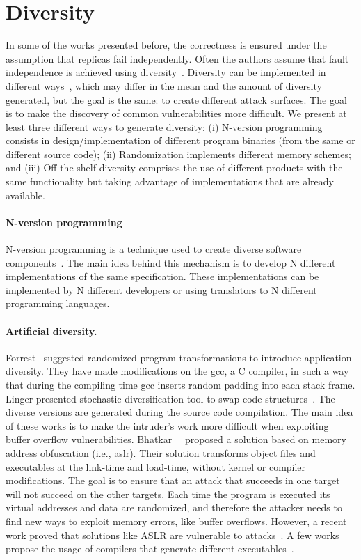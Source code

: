 \section{Diversity}

In some of the works presented before, the correctness is ensured under the assumption that replicas fail independently. 
Often the authors assume that fault independence is achieved using diversity~\cite{Castro:2002,Sousa:2010}. 
Diversity can be implemented in different ways~\cite{Deswarte:1998,Obelheiro:2006}, which may differ in the mean and the amount of diversity generated, but the goal is the same: to create different attack surfaces. 
The goal is to make the discovery of common vulnerabilities more difficult. 
We present at least three different ways to generate diversity: 
(i) N-version programming consists in design/implementation of different program binaries (from the same or different source code); 
(ii) Randomization implements different memory schemes; 
and (iii) Off-the-shelf diversity comprises the use of different products with the same functionality but taking advantage of implementations that are already available.

\paragraph{N-version programming}
N-version programming is a technique used to create diverse software components~\cite{Randell:1975,Avizienis:1977,Knight:1986,Chen:1995}.
The main idea behind this mechanism is to develop N different implementations of the same specification. 
These implementations can be implemented by N different developers or using translators to N different programming languages.

\paragraph{Artificial diversity.} 
Forrest~\cite{Forrest:1997} suggested randomized program transformations to introduce application diversity. 
They have made modifications on the gcc, a C compiler, in such a way that during the compiling time gcc inserts random padding
into each stack frame. 
Linger presented stochastic diversification tool to swap code structures~\cite{Bairavasundaram:2009,Larsen:2014}. 
The diverse versions are generated during the source code compilation. 
The main idea of these works is to make the intruder’s work more difficult when exploiting buffer overflow vulnerabilities.
Bhatkar~\etal{}~\cite{Bhatkar:2003} proposed a solution based on memory address obfuscation (i.e., \gls{aslr}). 
Their solution transforms object files and executables at the link-time and load-time, without kernel or compiler modifications. 
The goal is to ensure that an attack that succeeds in one target will not succeed on the other targets. 
Each time the program is executed its virtual addresses and data are randomized, and therefore the attacker needs to find new ways to exploit memory errors, like buffer overflows. 
However, a recent work proved that solutions like ASLR are vulnerable to attacks~\cite{Bittau:2014}.
A few works propose the usage of compilers that generate different executables~\cite{Platania:2014,Roeder:2010,King:2016}.


